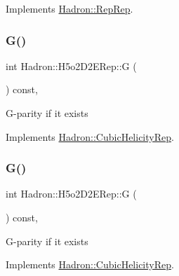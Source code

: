Implements \mbox{\hyperlink{structHadron_1_1RepRep_a92c8802e5ed7afd7da43ccfd5b7cd92b}{Hadron\+::\+Rep\+Rep}}.

\mbox{\label{structHadron_1_1H5o2D2ERep_a200f65c803901ee97ab23f0b2b4e0c3f}} 
\subsubsection{\texorpdfstring{G()}{G()}\hspace{0.1cm}{\footnotesize\ttfamily [1/3]}}
{\footnotesize\ttfamily int Hadron\+::\+H5o2\+D2\+E\+Rep\+::G (\begin{DoxyParamCaption}{ }\end{DoxyParamCaption}) const\hspace{0.3cm}{\ttfamily [inline]}, {\ttfamily [virtual]}}

G-\/parity if it exists 

Implements \mbox{\hyperlink{structHadron_1_1CubicHelicityRep_a50689f42be1e6170aa8cf6ad0597018b}{Hadron\+::\+Cubic\+Helicity\+Rep}}.

\mbox{\label{structHadron_1_1H5o2D2ERep_a200f65c803901ee97ab23f0b2b4e0c3f}} 
\subsubsection{\texorpdfstring{G()}{G()}\hspace{0.1cm}{\footnotesize\ttfamily [2/3]}}
{\footnotesize\ttfamily int Hadron\+::\+H5o2\+D2\+E\+Rep\+::G (\begin{DoxyParamCaption}{ }\end{DoxyParamCaption}) const\hspace{0.3cm}{\ttfamily [inline]}, {\ttfamily [virtual]}}

G-\/parity if it exists 

Implements \mbox{\hyperlink{structHadron_1_1CubicHelicityRep_a50689f42be1e6170aa8cf6ad0597018b}{Hadron\+::\+Cubic\+Helicity\+Rep}}.

\mbox{\label{structHadron_1_1H5o2D2ERep_a200f65c803901ee97ab23f0b2b4e0c3f}} 
